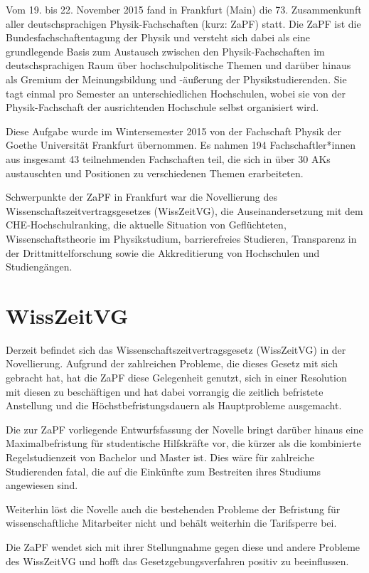 Vom 19. bis 22. November 2015 fand in Frankfurt (Main) die 73. Zusammenkunft aller deutschsprachigen Physik-Fachschaften (kurz: ZaPF) statt.
Die ZaPF ist die Bundesfachschaftentagung der Physik und versteht sich dabei als eine grundlegende Basis zum Austausch zwischen den Physik-Fachschaften im deutschsprachigen Raum über hochschulpolitische Themen und darüber hinaus als Gremium der Meinungsbildung und -äußerung der Physikstudierenden. Sie tagt einmal pro Semester an unterschiedlichen Hochschulen, wobei sie von der Physik-Fachschaft der ausrichtenden Hochschule selbst organisiert wird.

Diese Aufgabe wurde im Wintersemester 2015 von der Fachschaft Physik der Goethe Universität Frankfurt übernommen. Es nahmen 194 Fachschaftler*innen aus insgesamt 43 teilnehmenden Fachschaften teil, die sich in über 30 AKs austauschten und Positionen zu verschiedenen Themen erarbeiteten.

Schwerpunkte der ZaPF in Frankfurt war die Novellierung des Wissenschaftszeitvertragsgesetzes (WissZeitVG), die Auseinandersetzung mit dem CHE-Hochschulranking, die aktuelle Situation von Geflüchteten, Wissenschaftstheorie im Physikstudium, barrierefreies Studieren, Transparenz in der Drittmittelforschung sowie die Akkreditierung von Hochschulen und Studiengängen.

\newpage

\section*{WissZeitVG}
Derzeit befindet sich das Wissenschaftszeitvertragsgesetz (WissZeitVG) in der Novellierung. Aufgrund der zahlreichen Probleme, die dieses Gesetz mit sich gebracht hat, hat die ZaPF diese Gelegenheit genutzt, sich in einer Resolution mit diesen zu beschäftigen und hat dabei  vorrangig die zeitlich befristete Anstellung und die Höchstbefristungsdauern als Hauptprobleme ausgemacht.

Die zur ZaPF vorliegende Entwurfsfassung der Novelle bringt darüber hinaus eine Maximalbefristung für studentische Hilfskräfte vor, die kürzer als die kombinierte Regelstudienzeit von Bachelor und Master ist. Dies wäre für zahlreiche Studierenden fatal, die auf die Einkünfte zum Bestreiten ihres Studiums angewiesen sind.

Weiterhin löst die Novelle auch die bestehenden Probleme der Befristung für  wissenschaftliche Mitarbeiter nicht und behält weiterhin die Tarifsperre bei.

Die ZaPF wendet sich mit ihrer Stellungnahme gegen diese und andere Probleme des WissZeitVG und hofft das Gesetzgebungsverfahren positiv zu beeinflussen.

